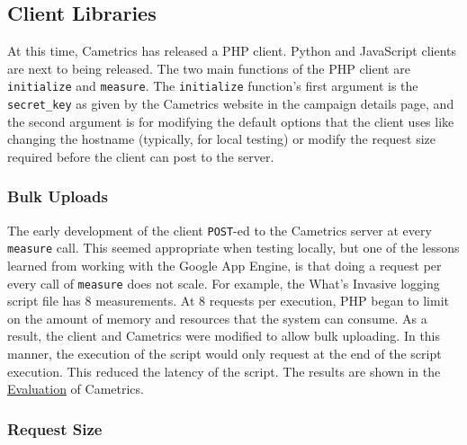 \documentclass[10pt,a4paper,english]{article}
\begin{document}

\hypertarget{client-libraries}{}
\subsection*{Client Libraries}
\label{client-libraries}

At this time, Cametrics has released a PHP client. Python and JavaScript clients are next to being released. The two main functions of the PHP client are \texttt{initialize} and \texttt{measure}. The \texttt{initialize} function's first argument is the \texttt{secret{\_}key} as given by the Cametrics website in the campaign details page, and the second argument is for modifying the default options that the client uses like changing the hostname (typically, for local testing) or modify the request size required before the client can post to the server.



\hypertarget{bulk-uploads}{}
\subsubsection*{Bulk Uploads}
\label{bulk-uploads}

The early development of the client \texttt{POST}-ed to the Cametrics server at every \texttt{measure} call. This seemed appropriate when testing locally, but one of the lessons learned from working with the Google App Engine, is that doing a request per every call of \texttt{measure} does not scale. For example, the What's Invasive logging script file has 8 measurements. At 8 requests per execution, PHP began to limit on the amount of memory and resources that the system can consume. As a result, the client and Cametrics were modified to allow bulk uploading. In this manner, the execution of the script would only request at the end of the script execution. This reduced the latency of the script. The results are shown in the \href{\#evaluation}{Evaluation} of Cametrics.



\hypertarget{request-size}{}
\subsubsection*{Request Size}
\label{request-size}
\end{document}
